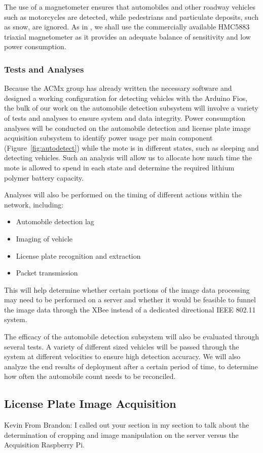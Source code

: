 \documentclass[11pt, oneside, fullpage, doublespace]{article}
\begin{document}
The use of a magnetometer ensures that automobiles and other roadway vehicles such as motorcycles are detected, while pedestrians and particulate deposits, such as snow, are ignored. As in \cite{stillwell2013}, we shall use the commercially available HMC5883 triaxial magnetometer as it provides an adequate balance of sensitivity and low power consumption.

\subsubsection{Tests and Analyses}
Because the ACMx group has already written the necessary software and designed a working configuration for detecting vehicles with the Arduino Fios, the bulk of our work on the automobile detection subsystem will involve a variety of tests and analyses to ensure system and data integrity. Power consumption analyses will be conducted on the automobile detection and license plate image acquisition subsystem to identify power usage per main component (Figure~\ref{fig:autodetect}) while the mote is in different states, such as sleeping and detecting vehicles. Such an analysis will allow us to allocate how much time the mote is allowed to spend in each state and determine the required lithium polymer battery capacity.

Analyses will also be performed on the timing of different actions within the network, including:
\begin{itemize}
\item Automobile detection lag
\item Imaging of vehicle
\item License plate recognition and extraction
\item Packet transmission
\end{itemize}
This will help determine whether certain portions of the image data processing may need to be performed on a server and whether it would be feasible to funnel the image data through the XBee instead of a dedicated directional IEEE 802.11 system.

The efficacy of the automobile detection subsystem will also be evaluated through several tests. A variety of different sized vehicles will be passed through the system at different velocities to ensure high detection accuracy. We will also analyze the end results of deployment after a certain period of time, to determine how often the automobile count needs to be reconciled.


\subsection{License Plate Image Acquisition}
Kevin
From Brandon: I called out your section in my section to talk about the determination of cropping and image manipulation on the server versus the Acquisition Raspberry Pi.
\end{document}
